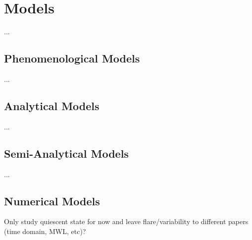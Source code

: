 \documentclass[twocolumn,tighten,dvipsnames]{aastex63}
\newcommand\<{{\langle}}
\renewcommand\>{{\rangle}} %
\begin{document}
\section{Models}

...

\subsection{Phenomenological Models}

...

\subsection{Analytical Models}

...

\subsection{Semi-Analytical Models}

...

\subsection{Numerical Models}


Only study quiescent state for now and leave flare/variability to different papers (time domain, MWL, etc)?
\end{document}
